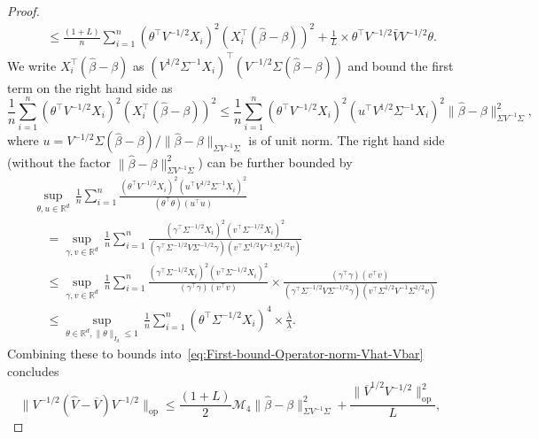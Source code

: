 \documentclass[11pt]{article}
\begin{document}
\begin{appendices}
\begin{proof}
\begin{align*}
&\quad\le \frac{(1 + L)}{n}\sum_{i=1}^n {(\theta^{\top}V^{-1/2}X_i)^2}(X_i^{\top}(\widehat{\beta} - \beta))^2 + \frac{1}{L}\times{\theta^{\top}V^{-1/2}\bar{V}V^{-1/2}\theta}.
\end{align*}
We write $X_i^{\top}(\widehat{\beta} - \beta)$ as $(V^{1/2}\Sigma^{-1}X_i)^{\top}(V^{-1/2}\Sigma(\widehat{\beta} - \beta))$ and bound the first term on the right hand side as
\[
\frac{1}{n}\sum_{i=1}^n {(\theta^{\top}V^{-1/2}X_i)^2}(X_i^{\top}(\widehat{\beta} - \beta))^2 \le \frac{1}{n}\sum_{i=1}^n (\theta^{\top}V^{-1/2}X_i)^2(u^{\top}V^{1/2}\Sigma^{-1}X_i)^2\|\widehat{\beta} - \beta\|_{\Sigma V^{-1}\Sigma}^2,
\]
where $u = V^{-1/2}\Sigma(\widehat{\beta} - \beta)/\|\widehat{\beta} - \beta\|_{\Sigma V^{-1}\Sigma}$ is of unit norm. The right hand side (without the factor $\|\widehat{\beta} - \beta\|_{\Sigma V^{-1}\Sigma}^2$) can be further bounded by
\begin{align*}
&\sup_{\theta, u\in\mathbb{R}^d}\,\frac{1}{n}\sum_{i=1}^n \frac{(\theta^{\top}V^{-1/2}X_i)^2(u^{\top}V^{1/2}\Sigma^{-1}X_i)^2}{(\theta^{\top}\theta)(u^{\top}u)}\\
&\quad= \sup_{\gamma, v\in\mathbb{R}^d}\,\frac{1}{n}\sum_{i=1}^n \frac{(\gamma^{\top}\Sigma^{-1/2}X_i)^2(v^{\top}\Sigma^{-1/2}X_i)^2}{(\gamma^{\top}\Sigma^{-1/2}V\Sigma^{-1/2}\gamma)(v^{\top}\Sigma^{1/2}V^{-1}\Sigma^{1/2}v)}\\
&\quad\le \sup_{\gamma, v\in\mathbb{R}^d}\,\frac{1}{n}\sum_{i=1}^n \frac{(\gamma^{\top}\Sigma^{-1/2}X_i)^2(v^{\top}\Sigma^{-1/2}X_i)^2}{(\gamma^{\top}\gamma)(v^{\top}v)}\times\frac{(\gamma^{\top}\gamma)(v^{\top}v)}{(\gamma^{\top}\Sigma^{-1/2}V\Sigma^{-1/2}\gamma)(v^{\top}\Sigma^{1/2}V^{-1}\Sigma^{1/2}v)}\\
&\quad\le \sup_{\theta\in\mathbb{R}^d,\|\theta\|_{I_d} \le 1}\,\frac{1}{n}\sum_{i=1}^n (\theta^{\top}\Sigma^{-1/2}X_i)^4\times\frac{\overline{\lambda}}{\underline{\lambda}}.
\end{align*}
Combining these to bounds into~\eqref{eq:First-bound-Operator-norm-Vhat-Vbar} concludes
\begin{equation}\label{eq:First-bound-Operator-norm-Vhat-Vbar}
\|V^{-1/2}(\widehat{V} - \overline{V})V^{-1/2}\|_{\mathrm{op}} \le \frac{(1 + L)}{2}\mathcal{M}_4\|\widehat{\beta} - \beta\|_{\Sigma V^{-1}\Sigma}^2 + \frac{\|\overline{V}^{1/2}V^{-1/2}\|_{\mathrm{op}}^2}{L},
\end{equation}

\end{proof}
\end{appendices}
\end{document}

